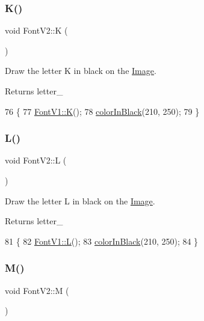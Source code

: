 \subsubsection{\texorpdfstring{K()}{K()}}
{\footnotesize\ttfamily void Font\+V2\+::K (\begin{DoxyParamCaption}{ }\end{DoxyParamCaption})}



Draw the letter K in black on the \mbox{\hyperlink{class_image}{Image}}. 

\begin{DoxyReturn}{Returns}
letter\+\_\+ 
\end{DoxyReturn}

\begin{DoxyCode}
76                \{
77     \mbox{\hyperlink{class_font_v1_a45ed7d1ac12bd32f458b5b144dd132ba}{FontV1::K}}();
78     \mbox{\hyperlink{class_font_v2_a04f2501961bc286ce70fbb6a840b0e8a}{colorInBlack}}(210, 250);
79 \}
\end{DoxyCode}
\mbox{\label{class_font_v2_ae40068da683965bc711e752af9acf360}} 
\subsubsection{\texorpdfstring{L()}{L()}}
{\footnotesize\ttfamily void Font\+V2\+::L (\begin{DoxyParamCaption}{ }\end{DoxyParamCaption})}



Draw the letter L in black on the \mbox{\hyperlink{class_image}{Image}}. 

\begin{DoxyReturn}{Returns}
letter\+\_\+ 
\end{DoxyReturn}

\begin{DoxyCode}
81                \{
82     \mbox{\hyperlink{class_font_v1_a17ba426bfb42af35ea882ab3beeba734}{FontV1::L}}();
83     \mbox{\hyperlink{class_font_v2_a04f2501961bc286ce70fbb6a840b0e8a}{colorInBlack}}(210, 250);
84 \}
\end{DoxyCode}
\mbox{\label{class_font_v2_a65ab055c8555447a542ed5c26ef925ee}} 
\subsubsection{\texorpdfstring{M()}{M()}}
{\footnotesize\ttfamily void Font\+V2\+::M (\begin{DoxyParamCaption}{ }\end{DoxyParamCaption})}



